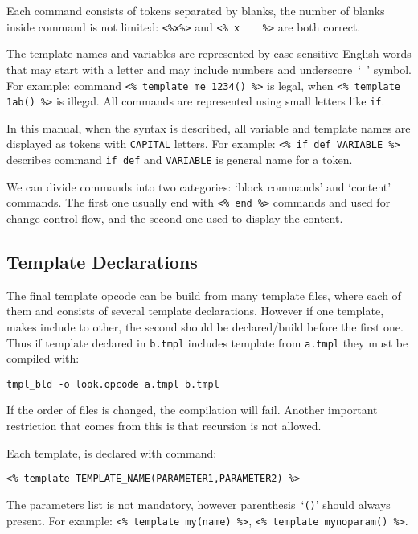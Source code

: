 \documentclass{article}
\newcommand{\tw}[1]{\texttt{#1}}
\begin{document}
Each command consists of tokens separated by blanks, the number of blanks inside command is not limited: \verb+<%x%>+ 
and \verb+<% x    %>+ are both correct.

The template names and variables are represented by case sensitive
English words that may start with a letter and may include numbers and underscore~`\tw{\_}' symbol. 
For example: command \verb+<% template me_1234() %>+ is legal, when \verb+<% template 1ab() %>+ is illegal.
All commands are represented using small letters like \tw{if}.

In this manual, when the syntax is described, all variable and template names are displayed as tokens 
with \tw{CAPITAL} letters. For example: \verb+<% if def VARIABLE %>+ describes command \tw{if~def} and \tw{VARIABLE} 
is general name for a token. 

We can divide commands into two categories: `block commands' and `content' commands. The first one usually end with \verb+<% end %>+ commands and used for change control flow, and the second one used to display the content. 

\subsection{Template Declarations}

The final template opcode can be build from many template files, where each of them and consists of several template declarations. However if one template, makes include to other, the second should be declared/build before the first one. Thus if template declared in \tw{b.tmpl} includes template from \tw{a.tmpl} they must be compiled with:

\begin{verbatim}
tmpl_bld -o look.opcode a.tmpl b.tmpl
\end{verbatim}

If the order of files is changed, the compilation will fail. 
Another important restriction that comes from this is that recursion is not allowed.

Each template, is declared with command:

\begin{verbatim}
<% template TEMPLATE_NAME(PARAMETER1,PARAMETER2) %>
\end{verbatim}

The parameters list is not mandatory, however parenthesis~`\tw{()}' should always present. 
For example: \verb+<% template my(name) %>+, \verb+<% template mynoparam() %>+.
\end{document}
